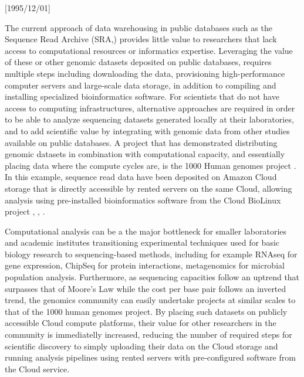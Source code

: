 \NeedsTeXFormat{LaTeX2e}[1995/12/01] \documentclass[10pt]{bmc_article}
\newenvironment{bmcformat}{\begin{raggedright}\baselineskip20pt\sloppy\setboolean{publ}{false}}{\end{raggedright}\baselineskip20pt\sloppy}
\begin{document}
\begin{bmcformat}
The current approach of data warehousing in public databases such as the Sequence Read Archive (SRA,\cite{sra}) 
provides little value to researchers that lack access to computational resources or informatics expertise. Leveraging
the value of these or other genomic datasets deposited on public databases, requires multiple steps including downloading
the data, provisioning high-performance computer servers and large-scale data storage, in addition to compiling and 
installing specialized bioinformatics software. For scientists that do not have access to computing infrastructures, 
alternative approaches are required in order to be able to analyze sequencing datasets generated locally at their
laboratories, and to add scientific value by integrating with genomic data from other studies available on public databases.
A project that has demonstrated distributing genomic datasets in combination with computational capacity, and essentially 
placing data where the compute cycles are, is the 1000 Human genomes project \cite{clarke2012}. In this example, sequence
read data have been deposited on Amazon Cloud storage that is directly accessible by rented servers on the same Cloud, 
allowing analysis using pre-installed bioinformatics software from the Cloud BioLinux project \cite{Krampis2012}, 
\cite{1000tube1}, \cite{1000tube2}. 

Computational analysis can be a the major bottleneck for smaller laboratories and academic institutes transitioning 
experimental techniques used for basic biology research to sequencing-based methods, including for example RNAseq for 
gene expression, ChipSeq for protein interactions, metagenomics for microbial population analysis. Furthermore, as 
sequencing capacities follow an uptrend that surpasses that of Moore's Law \cite{Meyer2006} while the cost per base pair follows
an inverted trend, the genomics community can easily undertake projects at similar scales to that of the 1000 human 
genomes project. By placing such datasets on publicly accessible Cloud compute platforms, their value for other 
researchers in the community is immediatelly increased, reducing the number of required steps for scientific 
discovery to simply uploading their data on the Cloud storage and running analysis pipelines using rented servers with 
pre-configured software from the Cloud service. 



\end{bmcformat}
\end{document}
